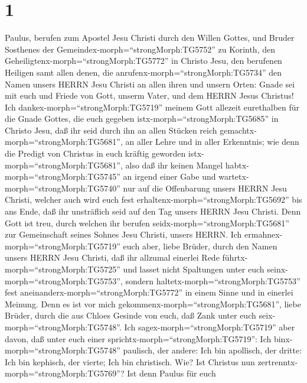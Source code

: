 \hypertarget{section}{%
\section{1}\label{section}}

 Paulus, berufen zum Apostel Jesu Christi durch den Willen
Gottes, und Bruder Sosthenes  der
Gemeindex-morph=``strongMorph:TG5752'' zu Korinth, den
Geheiligtenx-morph=``strongMorph:TG5772'' in Christo Jesu, den berufenen
Heiligen samt allen denen, die anrufenx-morph=``strongMorph:TG5734'' den
Namen unsers HERRN Jesu Christi an allen ihren und unsern Orten:
 Gnade sei mit euch und Friede von Gott, unserm Vater, und
dem HERRN Jesus Christus!  Ich
dankex-morph=``strongMorph:TG5719'' meinem Gott allezeit eurethalben für
die Gnade Gottes, die euch gegeben istx-morph=``strongMorph:TG5685'' in
Christo Jesu,  daß ihr seid durch ihn an allen Stücken reich
gemachtx-morph=``strongMorph:TG5681'', an aller Lehre und in aller
Erkenntnis;  wie denn die Predigt von Christus in euch
kräftig geworden istx-morph=``strongMorph:TG5681'',  also
daß ihr keinen Mangel habtx-morph=``strongMorph:TG5745'' an irgend einer
Gabe und wartetx-morph=``strongMorph:TG5740'' nur auf die Offenbarung
unsers HERRN Jesu Christi,  welcher auch wird euch fest
erhaltenx-morph=``strongMorph:TG5692'' bis ans Ende, daß ihr unsträflich
seid auf den Tag unsers HERRN Jesu Christi.  Denn Gott ist
treu, durch welchen ihr berufen seidx-morph=``strongMorph:TG5681'' zur
Gemeinschaft seines Sohnes Jesu Christi, unsers HERRN.  Ich
ermahnex-morph=``strongMorph:TG5719'' euch aber, liebe Brüder, durch den
Namen unsers HERRN Jesu Christi, daß ihr allzumal einerlei Rede
führtx-morph=``strongMorph:TG5725'' und lasset nicht Spaltungen unter
euch seinx-morph=``strongMorph:TG5753'', sondern
haltetx-morph=``strongMorph:TG5753'' fest
aneinanderx-morph=``strongMorph:TG5772'' in einem Sinne und in einerlei
Meinung.  Denn es ist vor mich
gekommenx-morph=``strongMorph:TG5681'', liebe Brüder, durch die aus
Chloes Gesinde von euch, daß Zank unter euch
seix-morph=``strongMorph:TG5748''.  Ich
sagex-morph=``strongMorph:TG5719'' aber davon, daß unter euch einer
sprichtx-morph=``strongMorph:TG5719'': Ich
binx-morph=``strongMorph:TG5748'' paulisch, der andere: Ich bin
apollisch, der dritte: Ich bin kephisch, der vierte; Ich bin christisch.
 Wie? Ist Christus nun
zertrenntx-morph=``strongMorph:TG5769''? Ist denn Paulus für euch
